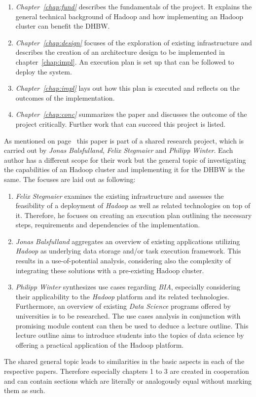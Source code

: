 \begin{enumerate}
    \item \emph{Chapter~\vref{chap:fund}} describes the fundamentals of the project. 
        It explains the general technical background of Hadoop and how implementing an Hadoop cluster can benefit the \ac{DHBW}. 
    \item \emph{Chapter~\vref{chap:design}} focuses of the exploration of existing
        infrastructure and describes the creation of an architecture design to be implemented in chapter~\ref{chap:impl}. 
        An execution plan is set up that can be followed to deploy the system.
    \item \emph{Chapter~\vref{chap:impl}} lays out how this plan is executed 
        and reflects on the outcomes of the implementation. 
    \item \emph{Chapter~\vref{chap:conc}} summarizes the paper 
        and discusses the outcome of the project critically.
        Further work that can succeed this project is listed.
\end{enumerate}

As mentioned on page~\pageref{chap:prenotes} this paper is part of a shared research project,
which is carried out by \emph{Jonas Balsfulland}, \emph{Felix Stegmaier} and \emph{Philipp Winter}.
Each author has a different scope for their work but the general topic of investigating the capabilities of an Hadoop cluster and implementing it for the \ac{DHBW} is the same.
The focuses are laid out as following:

\begin{enumerate}
	\item \emph{Felix Stegmaier} examines the existing infrastructure and assesses the feasibility of a deployment of \emph{Hadoop} as well as related technologies on top of it. Therefore, he focuses on creating an execution plan outlining the necessary steps, requirements and dependencies of the implementation.
	\item \emph{Jonas Balsfulland} aggregates an overview of existing applications utilizing \emph{Hadoop} as underlying data storage and/or task execution framework. This results in a use-of-potential analysis, considering also the complexity of integrating these solutions with a pre-existing Hadoop cluster.
	\item \emph{Philipp Winter} synthesizes use cases regarding \emph{\ac{BIA}}, especially considering their applicability to the \emph{Hadoop} platform and its related technologies. Furthermore, an overview of existing \emph{Data Science} programs offered by universities is to be researched. The use cases analysis in conjunction with promising module content can then be used to deduce a lecture outline. This lecture outline aims to introduce students into the topics of data science by offering a practical application of the Hadoop platform.
\end{enumerate}

The shared general topic leads to similarities in the basic aspects in each of the respective papers. Therefore especially chapters 1 to 3 are created in cooperation 
and can contain sections which are literally or analogously equal without marking them as such.
